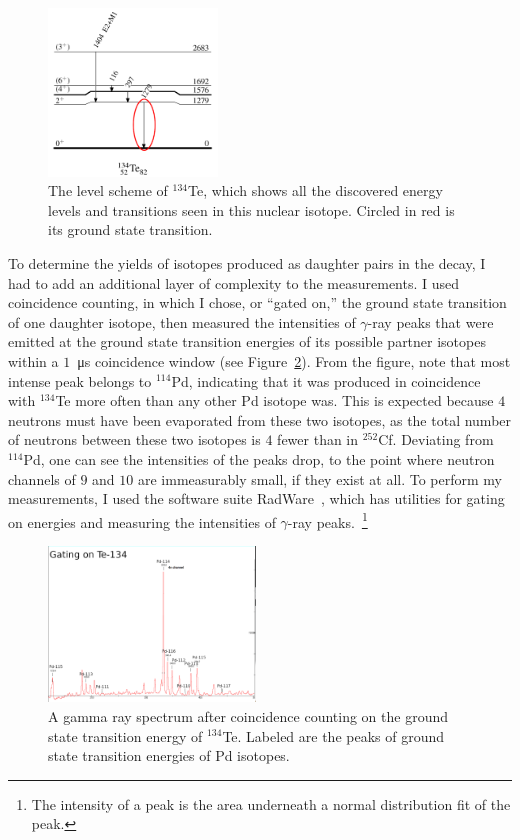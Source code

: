 \documentclass[12pt, letterpaper, twocolumn]{article}
\begin{document}
\begin{figure}[ht]
    \centering
    \includegraphics[width=0.4\textwidth]{img/level_scheme.png}
    \caption{The level scheme of $^{134}$Te, which shows all the discovered energy levels and transitions seen in this nuclear isotope. Circled in red is its ground state transition.}
    \label{fig:levels}
\end{figure}

To determine the yields of isotopes produced as daughter pairs in the decay, I had to add an additional layer of complexity to the measurements. I used coincidence counting, in which I chose, or ``gated on,'' the ground state transition of one daughter isotope, then measured the intensities of $\gamma$-ray peaks that were emitted at the ground state transition energies of its possible partner isotopes within a $1$~\si{\micro\second} coincidence window (see Figure~\ref{fig:spectrum}). From the figure, note that most intense peak belongs to $^{114}$Pd, indicating that it was produced in coincidence with $^{134}$Te more often than any other Pd isotope was. This is expected because $4$ neutrons must have been evaporated from these two isotopes, as the total number of neutrons between these two isotopes is $4$ fewer than in $^{252}$Cf. Deviating from $^{114}$Pd, one can see the intensities of the peaks drop, to the point where neutron channels of $9$ and $10$ are immeasurably small, if they exist at all. To perform my measurements, I used the software suite RadWare~\cite{RADFORD1995297}, which has utilities for gating on energies and measuring the intensities of $\gamma$-ray peaks.~\footnote{The intensity of a peak is the area underneath a normal distribution fit of the peak.}

\begin{figure}[ht]
    \centering
    \includegraphics[width=0.49\textwidth]{img/spectrum_labeled.png}
    \caption{A gamma ray spectrum after coincidence counting on the ground state transition energy of $^{134}$Te. Labeled are the peaks of ground state transition energies of Pd isotopes.}
    \label{fig:spectrum}
\end{figure}
\end{document}
